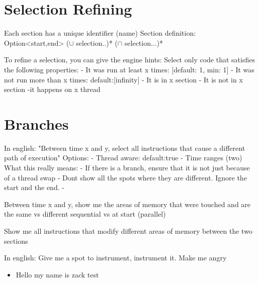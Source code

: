 \maketitle

\section{Selection Refining}

Each section has a unique identifier (name)
Section definition: Option<start,end> ($\cup$ selection..)* ($\cap$ selection...)*

To refine a selection, you can give the engine hints:
Select only code that satisfies the following properties:
- It was run at least x times: [default: 1, min: 1]
- It was not run more than x times: default:[infinity]
- It is in x section 
- It is not in {x} section
-it happens on x thread 


\section{Branches}
In english: "Between time x and y, select all instructions that cause a different path of execution"
Options:
- Thread aware: default:true
- Time ranges (two)
What this really means:
- If there is a branch, ensure that it is not just because of a thread swap
- Dont show all the spots where they are different. Ignore the start and the end. 
- 


Between time x and y, show me the areas of memory that were touched and are the same vs different 
sequential vs at start (parallel)

Show me all instructions that modify different areas of memory between the two sections 


In english: Give me a spot to instrument, instrument it.
Make me angry


\begin{itemize}
  \item 
Hello my name is zack
    test
\end{itemize}

